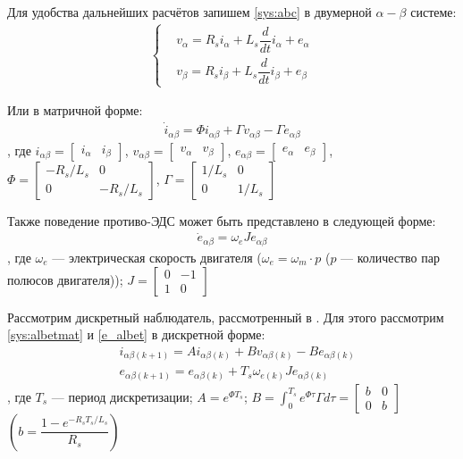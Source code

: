 Для удобства дальнейших расчётов запишем \ref{sys:abc} в двумерной $\alpha-\beta$ системе:
\begin{align}
\label{sys:albet}
\left\{ \begin{aligned} 
  &v_{\alpha}=R_si_{\alpha}+L_s\dfrac{d}{dt}i_{\alpha}+e_{\alpha}\\
  &v_{\beta}=R_si_{\beta}+L_s\dfrac{d}{dt}i_{\beta}+e_{\beta}
\end{aligned} \right.
\end{align}

Или в матричной форме: \cite{art:smo}
\begin{align}
\label{sys:albetmat}
\dot{i}_{\alpha\beta}=\Phi i_{\alpha\beta}+\Gamma v_{\alpha\beta}-\Gamma e_{\alpha\beta}
\end{align}, где $i_{\alpha\beta}=\begin{bmatrix}
	i_{\alpha} & i_{\beta}
\end{bmatrix}$, $v_{\alpha\beta}=\begin{bmatrix}
	v_{\alpha} & v_{\beta}
\end{bmatrix}$, $e_{\alpha\beta}=\begin{bmatrix}
	e_{\alpha} & e_{\beta}
\end{bmatrix}$, $\Phi=\begin{bmatrix}
	-R_s/L_s & 0 \\
	0 & -R_s/L_s
\end{bmatrix}$, $\Gamma = \begin{bmatrix}
	1/L_s & 0 \\
	0 & 1/L_s
\end{bmatrix}$

Также поведение противо-ЭДС может быть представлено в следующей форме:
\begin{align}
\label{e_albet}
	\dot{e}_{\alpha\beta}=\omega_eJe_{\alpha\beta}
\end{align}, где $\omega_e$ --- электрическая скорость двигателя ($\omega_e=\omega_m\cdot p$ ($p$ --- количество пар полюсов двигателя)); $J=\begin{bmatrix}
 0 & -1 \\
 1 & 0
\end{bmatrix}$

Рассмотрим дискретный наблюдатель, рассмотренный в \cite{art:smo}. Для этого рассмотрим \ref{sys:albetmat} и \ref{e_albet} в дискретной форме:
\begin{align}
	&i_{\alpha\beta(k+1)}=Ai_{\alpha\beta(k)}+Bv_{\alpha\beta(k)}-Be_{\alpha\beta(k)}\\
	&e_{\alpha\beta(k+1)}=e_{\alpha\beta(k)}+T_s\omega_{e(k)}Je_{\alpha\beta(k)}
\end{align}, где $T_s$ --- период дискретизации; $A=e^{\Phi T_s}$; $B=\int_0^{T_s}e^{\Phi\tau}\Gamma d\tau=\begin{bmatrix}
	b & 0 \\
	0 & b
\end{bmatrix}$ $\left(b=\dfrac{1-e^{-R_sT_s/L_s}}{R_s}\right)$

